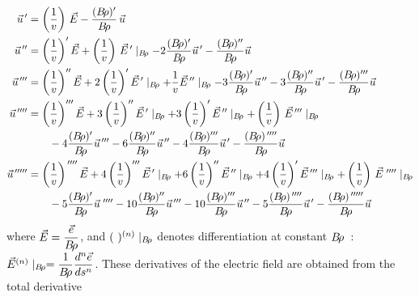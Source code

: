 \begin{equation}
	\begin{aligned}
		\vec  u^{\,\prime} 
		       & =  \left(\dfrac{1}{v}\right)\, \vec  E 
		             - \dfrac{(\Br )^\prime}{\Br} \, \vec  u\\
		\vec u^{\,\prime\prime} 
		       & =  \left(\dfrac{1}{v}\right)^\prime \vec  E 
		            + \left(\dfrac{1}{v}\right)\, \vec  E^{\,\prime} 
		            \mid_{ \Br}  -2 \dfrac{(\Br )^\prime }{ \Br} 
		             \vec  u^{\,\prime} -
		             \dfrac{(\Br)^{\prime\prime}}{\Br}  \vec  u \\
	    \vec  u^{\,\prime\prime\prime} 
	           &  = \left( \dfrac{1}{v}\right)^{\prime\prime}\vec  E
	               +2\left(\dfrac{1}{v}\right)^\prime \vec  E^{\,\prime} 
	               \mid_{ \Br} +\dfrac{1}{v} \vec  E^{\,\prime\prime} 
	               \mid_{ \Br} -3 \dfrac{(\Br )^\prime }{\Br}  \vec  u^{\,\prime\prime} 
	               -3 \dfrac{(\Br )^{\prime\prime}}{\Br}  \vec u^{\,\prime} 
	               - \dfrac{(\Br )^{\prime\prime\prime} }{\Br}  \vec  u \\
		\vec  u^{\quaprime}
		      & =  \left(\dfrac{1}{v}\right)^{\prime\prime\prime}  \vec  E 
		           +3\left(\dfrac{1}{v}\right)^{\prime\prime}\vec E^{\,\prime} \mid_{ \Br} 
		           +3\left( \dfrac{1}{v}\right)^\prime \vec  E^{\,\prime\prime} \mid_{\Br} 
		           +\left(\dfrac{1}{v}\right)\,\vec  E^{\,\prime\prime\prime} \mid_{\Br} \\
		      &  \qquad -4 \dfrac{(\Br )^\prime }{\Br}  \vec  u^{\,\prime\prime\prime} 
		           -6 \dfrac{(\Br )^{\prime\prime}}{\Br}  \vec  u^{\,\prime\prime} 
		           -4 \dfrac{(\Br )^{\prime\prime\prime} }{\Br}  \vec  u^{\,\prime} 
		           - \dfrac{(\Br )^{\quaprime}}{\Br}  \vec  u \\
             \vec  u^{\cinqprime}
		      & =  \left(\dfrac{1}{v}\right)^{\quaprime}  \vec  E 
		           +4\left(\dfrac{1}{v}\right)^{\prime\prime\prime}\vec E^{\,\prime} \mid_{ \Br} 
		           +6\left(\dfrac{1}{v}\right)^{\prime\prime}\vec E^{\,\prime\prime} \mid_{ \Br} 
		           +4\left( \dfrac{1}{v}\right)^\prime \vec  E^{\,\prime\prime\prime} \mid_{\Br} 
		           +\left(\dfrac{1}{v}\right)\,\vec  E^{\,\quaprime} \mid_{\Br} \\
		      &  \qquad -5 \dfrac{(\Br )^\prime }{\Br}  \vec  u^{\,\quaprime} 
		           -10 \dfrac{(\Br )^{\prime\prime}}{\Br}  \vec  u^{\,\prime\prime\prime} 
		           -10 \dfrac{(\Br )^{\prime\prime\prime}}{\Br}  \vec  u^{\,\prime\prime} 
		           -5 \dfrac{(\Br )^{\quaprime} }{\Br}  \vec  u^{\,\prime} 
		           - \dfrac{(\Br )^{\cinqprime}}{\Br}  \vec  u	\end{aligned}
	\label{eq2-2-10}
\end{equation}
%
where $ \vec  E=\dfrac{\vec  e}{B\!\rho} $, and $(~)^{(n)}\mid_{ B\!\rho} $ 
denotes differentiation at constant $ B\!\rho$~:  
$ \vec E^{(n)}\mid_{ B\!\rho} =   \dfrac{ 1}{B\!\rho} \dfrac{d^n\vec  e }{ds^n}$.  
These derivatives of the electric field are obtained from the total 
derivative

